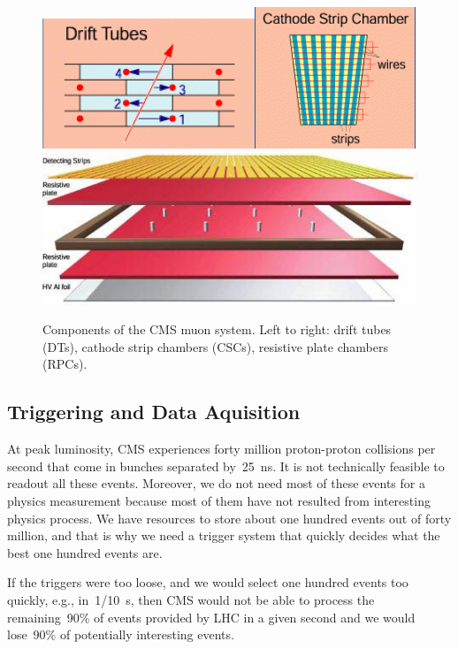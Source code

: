 \begin{figure}[htb]
  \begin{center}
    \includegraphics[height=2.5 cm]{../figs/Exp/muonSystem_driftTubes.png}\quad\includegraphics[height=2.5 cm]{../figs/Exp/muonSystem_CSC.png}\quad\includegraphics[height=2.5 cm]{../figs/Exp/muonSystem_RPC.png}
    \caption{Components of the CMS muon system. Left to right: drift tubes (DTs), cathode strip chambers (CSCs), resistive plate chambers (RPCs).}
    \label{fig:muonSystem}
  \end{center}
\end{figure}


\subsection{Triggering and Data Aquisition}

At peak luminosity, CMS experiences forty million proton-proton collisions per second that come in bunches separated by~25~ns. It is not technically feasible to readout all these events. Moreover, we do not need most of these events for a physics measurement because most of them have not resulted from interesting physics process. We have resources to store about one hundred events out of forty million, and that is why we need a trigger system that quickly decides what the best one hundred events are.


If the triggers were too loose, and we would select one hundred events too quickly, e.g., in~1/10~s, then CMS would not be able to process the remaining~90\% of events provided by LHC in a given second and we would lose~90\% of potentially interesting events.


